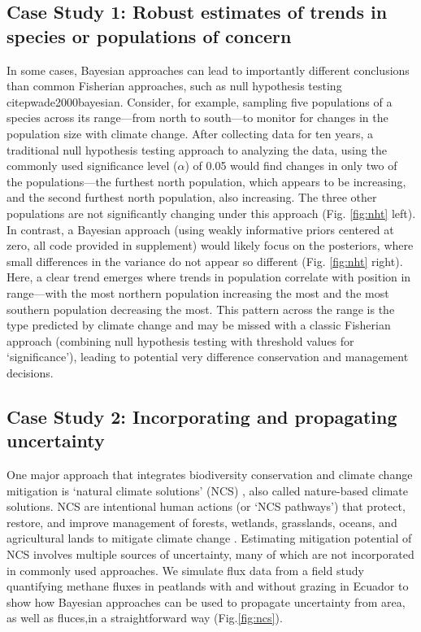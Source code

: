 \documentclass{article}
\begin{document}
\subsection*{Case Study 1: Robust estimates of trends in species or populations of concern}
\par In some cases, Bayesian approaches can lead to importantly different conclusions than common Fisherian approaches, such as null hypothesis testing citep{wade2000bayesian}. Consider, for example, sampling five populations of a species across its range---from north to south---to monitor for changes in the population size with climate change. After collecting data for ten years, a traditional null hypothesis testing approach to analyzing the data, using the commonly used significance level ($\alpha$) of 0.05 would find changes in only two of the populations---the furthest north population, which appears to be increasing, and the second furthest north population, also increasing. The three other populations are not significantly changing under this approach (Fig. \ref{fig:nht} left). In contrast, a Bayesian approach (using weakly informative priors centered at zero, all code provided in supplement) would likely focus on the posteriors, where small differences in the variance do not appear so different  (Fig. \ref{fig:nht} right). Here, a clear trend emerges where trends in population correlate with position in range---with the most northern population increasing the most and the most southern population decreasing the most. This pattern across the range is the type predicted by climate change and may be missed with a classic Fisherian approach (combining null hypothesis testing with threshold values for `significance'), leading to potential very difference conservation and management decisions. %


\subsection*{Case Study 2: Incorporating and propagating uncertainty}

\par One major approach that integrates biodiversity conservation and climate change mitigation is `natural climate solutions' (NCS) \citep{ellis2024principles}, also called nature-based climate solutions. NCS are intentional human actions (or `NCS pathways') that protect, restore, and improve management of forests, wetlands, grasslands, oceans, and agricultural lands to mitigate climate change \citep{griscom2017natural}. Estimating mitigation potential of NCS involves multiple sources of uncertainty, many of which are not incorporated in commonly used approaches. We simulate flux data from a field study quantifying methane fluxes in peatlands with and without grazing in Ecuador \citep{sanchez2017carbon} to show how Bayesian approaches can be used to propagate uncertainty from area, as well as fluces,in a straightforward way (Fig.\ref{fig:ncs}). 
\end{document}
